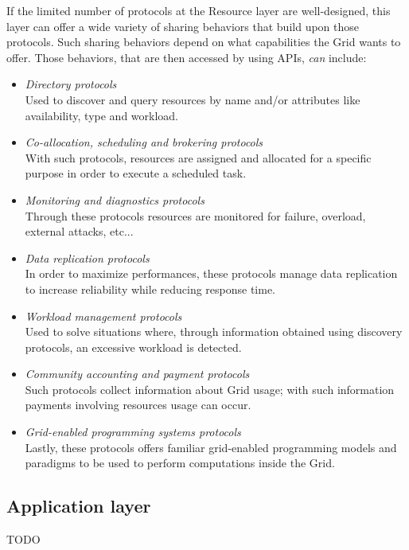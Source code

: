 If the limited number of protocols at the Resource layer are well-designed, this layer can offer a wide variety of sharing behaviors that build upon those protocols. Such sharing behaviors depend on what capabilities the Grid wants to offer. Those behaviors, that are then accessed by using APIs, \textit{can} include:
\begin{itemize}
    \item \textit{Directory protocols}\\
    Used to discover and query resources by name and/or attributes like availability, type and workload.
    \item \textit{Co-allocation, scheduling and brokering protocols}\\
    With such protocols, resources are assigned and allocated for a specific purpose in order to execute a scheduled task.
    \item \textit{Monitoring and diagnostics protocols}\\
    Through these protocols resources are monitored for failure, overload, external attacks, etc...
    \item \textit{Data replication protocols}\\
    In order to maximize performances, these protocols manage data replication to increase reliability while reducing response time.
    \item \textit{Workload management protocols}\\
    Used to solve situations where, through information obtained using discovery protocols, an excessive workload is detected.
    \item \textit{Community accounting and payment protocols}\\
    Such protocols collect information about Grid usage; with such information payments involving resources usage can occur.
    \item \textit{Grid-enabled programming systems protocols}\\
    Lastly, these protocols offers familiar grid-enabled programming models and paradigms to be used to perform computations inside the Grid. 
\end{itemize}

\subsection{Application layer}
TODO
